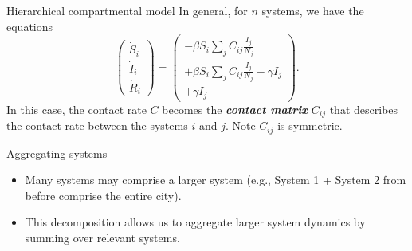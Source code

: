 \documentclass[aspectratio=169]{beamer}
\newcommand\boldgreen[1]{\textcolor{lighter_csu_green}{\emph{\textbf{#1}}}}
\begin{document}
\begin{frame}{Hierarchical compartmental model}
\vfill
\pause
    In general, for $n$ systems, we have the equations
    \[
    \begin{pmatrix} \dot{S}_i \\ \dot{I}_i \\ \dot{R}_i \end{pmatrix} = \begin{pmatrix} -\beta S_i \sum_j C_{ij} \frac{I_j}{N_j} \\ +\beta  S_i \sum_j C_{ij} \frac{I_j}{N_j} - \gamma I_j \\ + \gamma I_j \end{pmatrix}.
    \]
    \pause
    In this case, the contact rate $C$ becomes the \boldgreen{contact matrix} $C_{ij}$ that describes the contact rate between the systems $i$ and $j$. Note $C_{ij}$ is symmetric.
    \vfill
\end{frame}

\begin{frame}{Aggregating systems}
    \vfill
    \begin{itemize}
    \pause
    \item Many systems may comprise a larger system (e.g., System 1 + System 2 from before comprise the entire city).
    \pause
    \item This decomposition allows us to aggregate larger system dynamics by summing over relevant systems.
    \end{itemize}
    \vfill
\end{frame}
\end{document}
